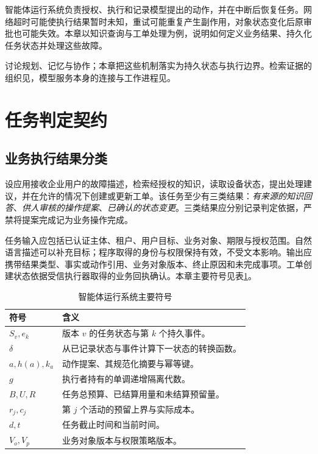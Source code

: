 \documentclass[../textbook.tex]{subfiles}
\begin{document}
\fi
{}

智能体运行系统负责授权、执行和记录模型提出的动作，并在中断后恢复任务。网络超时可能使执行结果暂时未知，重试可能重复产生副作用，对象状态变化后原审批也可能失效。本章以知识查询与工单处理为例，说明如何定义业务结果、持久化任务状态并处理这些故障。

讨论规划、记忆与协作；本章把这些机制落实为持久状态与执行边界。检索证据的组织见，模型服务本身的连接与工作进程见。

\section{任务判定契约}

\subsection{业务执行结果分类}
设应用接收企业用户的故障描述，检索经授权的知识，读取设备状态，提出处理建议，并在允许的情况下创建或更新工单。该任务至少有三类结果：\emph{有来源的知识回答}、\emph{供人审核的操作提案}、\emph{已确认的状态变更}。三类结果应分别记录判定依据，严禁将提案完成记为业务操作完成。

任务输入应包括已认证主体、租户、用户目标、业务对象、期限与授权范围。自然语言描述可以补充目标；程序取得的身份与权限保持有效，不受文本影响。输出应携带结果类型、事实或动作引用、业务对象版本、终止原因和未完成事项。工单创建状态依据受信执行器取得的业务回执确认。本章主要符号见表\ref{tab:agent-runtime-symbols}。

\begin{table}[htbp]
\centering
\caption{智能体运行系统主要符号}
\label{tab:agent-runtime-symbols}
\begin{tabular}{ll}
\toprule
符号 & 含义\\
\midrule
$S_v,e_k$ & 版本 $v$ 的任务状态与第 $k$ 个持久事件。\\
$\delta$ & 从已记录状态与事件计算下一状态的转换函数。\\
$a,h(a),k_a$ & 动作提案、其规范化摘要与幂等键。\\
$g$ & 执行者持有的单调递增隔离代数。\\
$B,U,R$ & 任务总预算、已结算用量和未结算预留量。\\
$r_j,c_j$ & 第 $j$ 个活动的预留上界与实际成本。\\
$d,t$ & 任务截止时间和当前时间。\\
$V_o,V_p$ & 业务对象版本与权限策略版本。\\
\bottomrule
\end{tabular}
\end{table}
\end{document}
